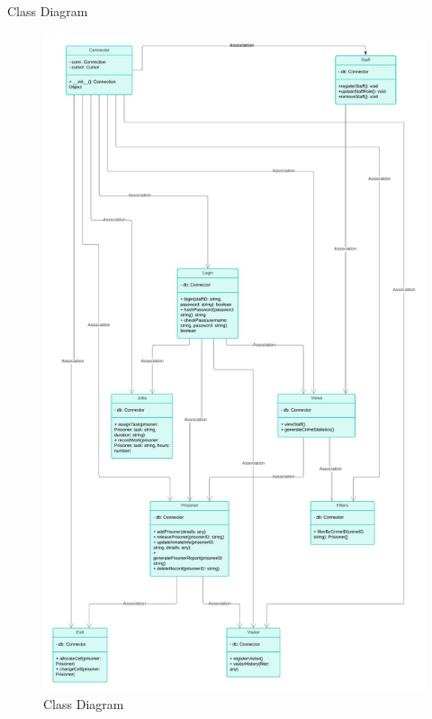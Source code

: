 \documentclass[aspectratio=169]{beamer}
\begin{document}
\begin{frame}{Class Diagram}
    \begin{figure}
        \centering
        \includegraphics[scale=0.1]{class.png}
        \caption{Class Diagram}
        \label{fig:class}
    \end{figure}
\end{frame}
\end{document}
